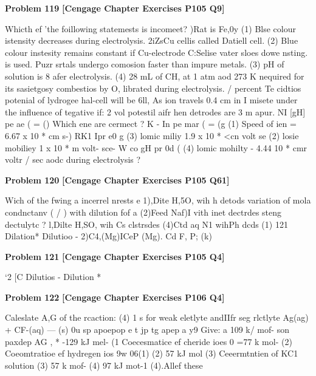 \begin{problembox}
\textbf{Problem 119} \hfill \textbf{[Cengage Chapter Exercises P105 Q9]}
\label{q:ext-cng-th-119}

Whicth ef 'the foillowing statemests is  incomeet?
)Rat is Fe,0y
(1) Blse colour istensity decreases during electrolysis.
2iZsCu cellis called Datiell cell.
(2) Blue colour instesity remains constant if Cu-electrode
C:Selise vater sloes dowe nsting.
is used.
Puzr srtals undergo comosion faster than impure metals.
(3) pH of solution is 8 afer electrolysis.
(4) 28 mL of CH, at 1 atm aod 273 K nequired for its
sasietgosy
combestios by O, librated during electrolysis.
/ percent  Te cidtios potenial of lydrogee hal-cell will be
6ll, As ion travels 0.4 cm in I misete under the influence of
tegative if:
2 vol potestil aifr hen detrodes are 3 m apur.
NI  [gH] pe ae ( = ()
Which ene are cermect ?
K - In pe mar ( =   (g
(1) Speed of ien = 6.67 x 10 * cm s-)
RK1  Ipr e0 g
(3) lomic miliy  1.9 x 10 * <cn volt   se
(2) losie mobiliey  1 x 10 * m  volt-  sce-
W co gH pr 0d (
(4) lomic mohilty - 4.44  10 * cmr voltr / sec 
 aodc during electrolysis ?
\end{problembox}

\begin{problembox}
\textbf{Problem 120} \hfill \textbf{[Cengage Chapter Exercises P105 Q61]}
\label{q:ext-cng-th-120}

Wich of the fwing a incerrel nrests e
1),Dite H,5O, wih h detods
variation of mola condnctanv ( / ) with dilution fof a
(2)Feed Naf)I vith inet dectrdes
steng dectulytc ?
l,Dilte H,SO, wih Cs clstrsdes
(4)Ctd aq N1 wihPh dcds
(1)
121
Dilation*
Dilutioo -
2)C4,(Mg)ICeP (Mg). Cd
F,
P;
(k)
\end{problembox}

\begin{problembox}
\textbf{Problem 121} \hfill \textbf{[Cengage Chapter Exercises P105 Q4]}
\label{q:ext-cng-th-121}

`2
[C
Dilutios -
Dilution *
\end{problembox}

\begin{problembox}
\textbf{Problem 122} \hfill \textbf{[Cengage Chapter Exercises P106 Q4]}
\label{q:ext-cng-th-122}

Caleslate A,G  of the rcaction:
(4) 1 s for weak eletlyte andIIfr seg rlctlyte
Ag(ag) + CF-(aq) --- (s)
0u sp apoepop e t jp tg apep a y9
Give: a    109 k/ mof-
son paxdep
AG , * -129 kJ mel-
(1 Coecesmatice ef cheride ioes
0  =77 k mol-
(2) Coeomtratioe ef hydregen ios
9w 06(1)
(2) 57 kJ mol
(3) Ceeermtntien of KC1 solution
(3) 57 k mof-
(4) 97 kJ mot-1
(4).Allef these
\end{problembox}


